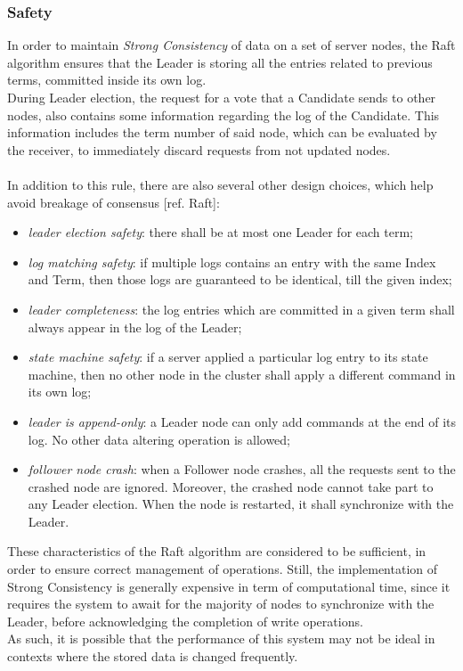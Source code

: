 \subsubsection{Safety}
In order to maintain \textit{Strong Consistency} of data on a set of server nodes, the Raft algorithm ensures that the Leader is storing all the entries related to previous terms, committed inside its own log. \\
During Leader election, the request for a vote that a Candidate sends to other nodes, also contains some information regarding the log of the Candidate. This information includes the term number of said node, which can be evaluated by the receiver, to immediately discard requests from not updated nodes. \\ \\
In addition to this rule, there are also several other design choices, which help avoid breakage of consensus [ref. Raft]:
\begin{itemize}
	\item \textit{leader election safety}: there shall be at most one Leader for each term;
	\item \textit{log matching safety}: if multiple logs contains an entry with the same Index and Term, then those logs are guaranteed to be identical, till the given index;
	\item \textit{leader completeness}: the log entries which are committed in a given term shall always appear in the log of the Leader;
	\item \textit{state machine safety}: if a server applied a particular log entry to its state machine, then no other node in the cluster shall apply a different command in its own log;
	\item \textit{leader is append-only}: a Leader node can only add commands at the end of its log. No other data altering operation is allowed;
	\item \textit{follower node crash}: when a Follower node crashes, all the requests sent to the crashed node are ignored. Moreover, the crashed node cannot take part to any Leader election. When the node is restarted, it shall synchronize with the Leader.
\end{itemize}
These characteristics of the Raft algorithm are considered to be sufficient, in order to ensure correct management of operations. Still, the implementation of Strong Consistency is generally expensive in term of computational time, since it requires the system to await for the majority of nodes to synchronize with the Leader, before acknowledging the completion of write operations. \\
As such, it is possible that the performance of this system may not be ideal in contexts where the stored data is changed frequently.

